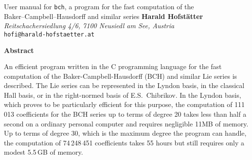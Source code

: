 \documentclass[11pt,a4paper]{article}
\begin{document}
\begin{center}
    {\LARGE User manual for {\tt bch}, a program for the fast computation of the\\[2mm]
    Baker--Campbell--Hausdorff and similar series}
\vskip 20pt
{\bf Harald Hofst\"atter}\\ %
{\small\it Reitschachersiedlung 4/6, 7100 Neusiedl am See, Austria}\\
{\tt hofi@harald-hofstaetter.at}\\ %
\end{center}
\vskip 20pt



\centerline{\bf Abstract}
\noindent
An efficient  program written in the C programming language for the fast computation
of the Baker-Campbell-Hausdorff (BCH) and similar Lie series is described.
The Lie series can be represented in the Lyndon basis, in the
classical Hall basis, or in the right-normed basis of 
E.S.~Chibrikov.  In the Lyndon basis,
which proves to be particularly efficient for this purpose,
the computation of 111\,013 coefficients for the BCH series up to terms of degree 20
takes less than half a second on a ordinary personal computer and requires negligible 11MB of memory.
Up to terms of degree 30, which is the maximum degree the program can handle, 
the computation of 74\,248\,451 coefficients takes 55 hours but still requires only a modest 5.5\,GB of  memory.


\vskip 30pt

\end{document}
